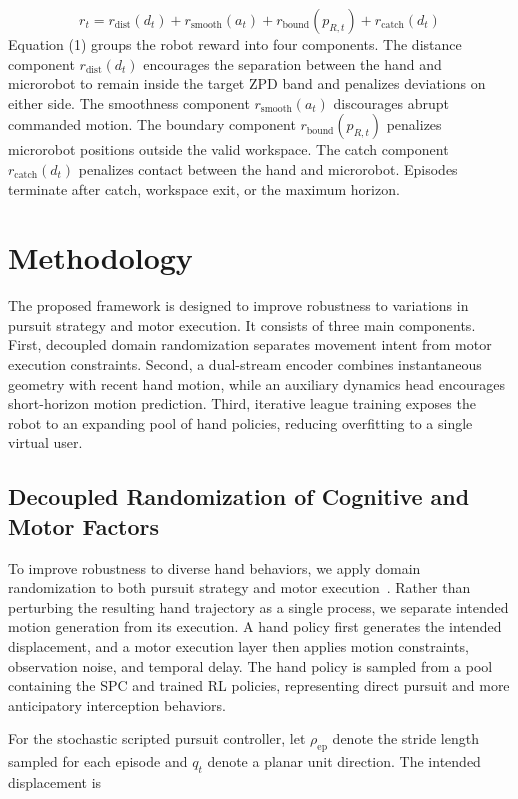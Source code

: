 \documentclass[journal,twoside,web]{ieeecolor2}
\begin{document}
\begin{equation}
r_t = r_{\mathrm{dist}}(d_t) + r_{\mathrm{smooth}}(a_t) + r_{\mathrm{bound}}(p_{R,t}) + r_{\mathrm{catch}}(d_t)
\end{equation}
Equation (1) groups the robot reward into four components. The distance component $r_{\mathrm{dist}}(d_t)$ encourages the separation between the hand and microrobot to remain inside the target ZPD band and penalizes deviations on either side. The smoothness component $r_{\mathrm{smooth}}(a_t)$ discourages abrupt commanded motion. The boundary component $r_{\mathrm{bound}}(p_{R,t})$ penalizes microrobot positions outside the valid workspace. The catch component $r_{\mathrm{catch}}(d_t)$ penalizes contact between the hand and microrobot. Episodes terminate after catch, workspace exit, or the maximum horizon.

\section{Methodology}
The proposed framework is designed to improve robustness to variations in pursuit strategy and motor execution. It consists of three main components. First, decoupled domain randomization separates movement intent from motor execution constraints. Second, a dual-stream encoder combines instantaneous geometry with recent hand motion, while an auxiliary dynamics head encourages short-horizon motion prediction. Third, iterative league training exposes the robot to an expanding pool of hand policies, reducing overfitting to a single virtual user.

\subsection{Decoupled Randomization of Cognitive and Motor Factors}
To improve robustness to diverse hand behaviors, we apply domain randomization to both pursuit strategy and motor execution~\cite{b35,b36,b37,b38,b39}. Rather than perturbing the resulting hand trajectory as a single process, we separate intended motion generation from its execution. A hand policy first generates the intended displacement, and a motor execution layer then applies motion constraints, observation noise, and temporal delay. The hand policy is sampled from a pool containing the SPC and trained RL policies, representing direct pursuit and more anticipatory interception behaviors.

For the stochastic scripted pursuit controller, let $\rho_{\mathrm{ep}}$ denote the stride length sampled for each episode and $q_t$ denote a planar unit direction. The intended displacement is
\end{document}

